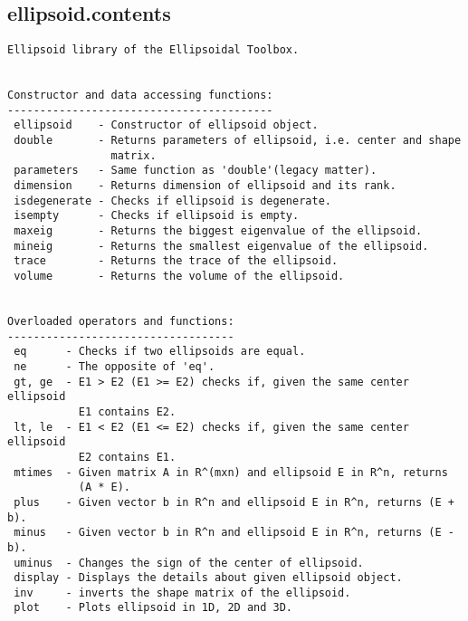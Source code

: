 \subsection{\texorpdfstring{ellipsoid.contents}{contents}}\label{method:ellipsoid.contents}
\begin{verbatim}
Ellipsoid library of the Ellipsoidal Toolbox.


Constructor and data accessing functions:
-----------------------------------------
 ellipsoid    - Constructor of ellipsoid object.
 double       - Returns parameters of ellipsoid, i.e. center and shape
                matrix.
 parameters   - Same function as 'double'(legacy matter).
 dimension    - Returns dimension of ellipsoid and its rank.
 isdegenerate - Checks if ellipsoid is degenerate.
 isempty      - Checks if ellipsoid is empty.
 maxeig       - Returns the biggest eigenvalue of the ellipsoid.
 mineig       - Returns the smallest eigenvalue of the ellipsoid.
 trace        - Returns the trace of the ellipsoid.
 volume       - Returns the volume of the ellipsoid.


Overloaded operators and functions:
-----------------------------------
 eq      - Checks if two ellipsoids are equal.
 ne      - The opposite of 'eq'.
 gt, ge  - E1 > E2 (E1 >= E2) checks if, given the same center ellipsoid
           E1 contains E2.
 lt, le  - E1 < E2 (E1 <= E2) checks if, given the same center ellipsoid
           E2 contains E1.
 mtimes  - Given matrix A in R^(mxn) and ellipsoid E in R^n, returns
           (A * E).
 plus    - Given vector b in R^n and ellipsoid E in R^n, returns (E + b).
 minus   - Given vector b in R^n and ellipsoid E in R^n, returns (E - b).
 uminus  - Changes the sign of the center of ellipsoid.
 display - Displays the details about given ellipsoid object.
 inv     - inverts the shape matrix of the ellipsoid.
 plot    - Plots ellipsoid in 1D, 2D and 3D.



\end{verbatim}

